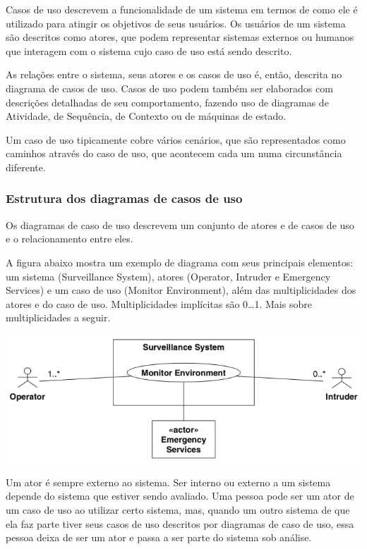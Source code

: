 Casos de uso descrevem a funcionalidade de um sistema em termos de como ele é utilizado para atingir os objetivos de seus usuários. Os usuários de um sistema são descritos como atores, que podem representar sistemas externos ou humanos que interagem com o sistema cujo caso de uso está sendo descrito.

As relações entre o sistema, seus atores e os casos de uso é, então, descrita no diagrama de casos de uso.
Casos de uso podem também ser elaborados com descrições detalhadas de seu comportamento, fazendo uso de diagramas de Atividade, de Sequência, de Contexto ou de máquinas de estado.

Um caso de uso tipicamente cobre vários cenários, que são representados como caminhos através do caso de uso, que acontecem cada um numa circunstância diferente.

\subsubsection{Estrutura dos diagramas de casos de uso}
Os diagramas de caso de uso descrevem um conjunto de atores e de casos de uso e o relacionamento entre eles.

A figura abaixo mostra um exemplo de diagrama com seus principais elementos: um sistema (Surveillance System), atores (Operator, Intruder e Emergency Services) e um caso de uso (Monitor Environment), além das multiplicidades dos atores e do caso de uso. Multiplicidades implícitas são 0…1. Mais sobre multiplicidades a seguir.

\includegraphics[width=\textwidth,height=\textheight,keepaspectratio]{imagens/diagrama-caso-de-uso-1.png}

Um ator é sempre externo ao sistema. Ser interno ou externo a um sistema depende do sistema que estiver sendo avaliado. Uma pessoa pode ser um ator de um caso de uso ao utilizar certo sistema, mas, quando um outro sistema de que ela faz parte tiver seus casos de uso descritos por diagramas de caso de uso, essa pessoa deixa de ser um ator e passa a ser parte do sistema sob análise.


